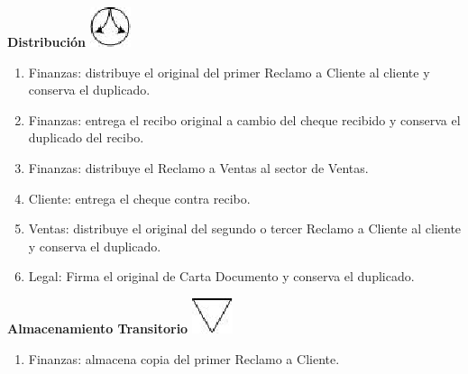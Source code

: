 \begin{center}
  \textbf{Distribución}
  \includegraphics{./Images/Simbolos/simbolo-Distribucion.png}
\end{center}
\begin{enumerate}
\item Finanzas: distribuye el original del primer Reclamo a Cliente al cliente y conserva el duplicado.
\item Finanzas: entrega el recibo original a cambio del cheque recibido y conserva el duplicado del recibo.
\item Finanzas: distribuye el Reclamo a Ventas al sector de Ventas.
\item Cliente: entrega el cheque contra recibo.
\item Ventas: distribuye el original del segundo o tercer Reclamo a Cliente al cliente y conserva el duplicado.
\item Legal: Firma el original de Carta Documento y conserva el duplicado.
\end{enumerate}

\begin{center}
  \textbf{Almacenamiento Transitorio}
  \includegraphics{./Images/Simbolos/simbolo-Almacenamiento-Transitorio.png}
\end{center}
\begin{enumerate}
\item Finanzas: almacena copia del primer Reclamo a Cliente.
\end{enumerate}

